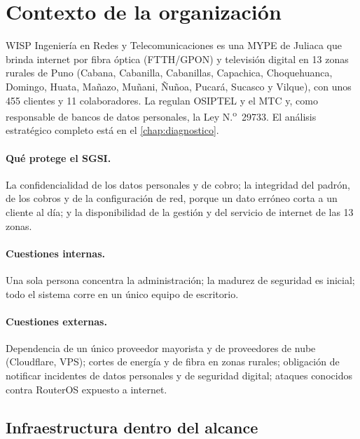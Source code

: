 \section{Contexto de la organización}

WISP Ingeniería en Redes y Telecomunicaciones es una MYPE de Juliaca que brinda internet
por fibra óptica (FTTH/GPON) y televisión digital en 13 zonas rurales de Puno (Cabana,
Cabanilla, Cabanillas, Capachica, Choquehuanca, Domingo, Huata, Mañazo, Muñani, Ñuñoa,
Pucará, Sucasco y Vilque), con unos 455 clientes y 11 colaboradores. La regulan OSIPTEL y
el MTC y, como responsable de bancos de datos personales, la Ley N.\textsuperscript{o}~29733.
El análisis estratégico completo está en el \cref{chap:diagnostico}.

\paragraph{Qué protege el SGSI.} La confidencialidad de los datos personales y de cobro;
la integridad del padrón, de los cobros y de la configuración de red, porque un dato
erróneo corta a un cliente al día; y la disponibilidad de la gestión y del servicio de
internet de las 13 zonas.

\paragraph{Cuestiones internas.} Una sola persona concentra la administración; la
madurez de seguridad es inicial; todo el sistema corre en un único equipo de escritorio.
\paragraph{Cuestiones externas.} Dependencia de un único proveedor mayorista y de
proveedores de nube (Cloudflare, VPS); cortes de energía y de fibra en zonas rurales;
obligación de notificar incidentes de datos personales y de seguridad digital; ataques
conocidos contra RouterOS expuesto a internet.

\subsection{Infraestructura dentro del alcance}

